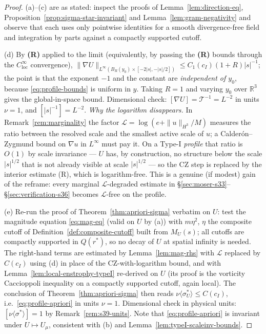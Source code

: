 \documentclass[11pt]{article}
\theoremstyle{definition}
\theoremstyle{remark}
\newcommand{\R}{\mathbb{R}}
\begin{document}
\begin{proof}
  (a)--(c) are as stated: inspect the proofs of
  Lemma~\ref{lem:direction-eq}, Proposition~\ref{prop:sigma-star-invariant}
  and Lemma~\ref{lem:gram-negativity} and observe that each uses only
  pointwise identities for a smooth divergence-free field and integration by
  parts against a compactly supported cutoff.

  (d) By \textbf{(R)} applied to the limit (equivalently, by passing the
  \textbf{(R)} bounds through the $C^\infty_{\mathrm{loc}}$ convergence),
  $\|\nabla U\|_{L^\infty(B_R(y_0)\times[-2|s|,-|s|/2])}\leq
  C_1(c_I)(1+R)|s|^{-1}$; the point is that the exponent $-1$ and the
  constant are \emph{independent of $y_0$}, because
  \eqref{eq:profile-bounds} is uniform in $y$. Taking $R=1$ and varying
  $y_0$ over $\R^3$ gives the global-in-space bound. Dimensional check:
  $[\nabla U] = \mathcal{T}^{-1} = L^{-2}$ in units $\nu=1$, and
  $[|s|^{-1}]=L^{-2}$. \emph{Why the logarithm disappears.} In
  Remark~\ref{rem:marginality} the factor
  $\mathcal{L}=\log(e+\|u\|_{H^3}/M)$ measures the ratio between the resolved
  scale and the smallest active scale of $u$; a Calder\'on--Zygmund bound on
  $\nabla u$ in $L^\infty$ must pay it. On a Type-I \emph{profile} that ratio
  is $O(1)$ by scale invariance --- $U$ has, by construction, no structure
  below the scale $|s|^{1/2}$ that is not already visible at scale
  $|s|^{1/2}$ --- so the CZ step is replaced by the interior estimate (R),
  which is logarithm-free. This is a genuine (if modest) gain of the reframe:
  every marginal $\mathcal{L}$-degraded estimate in
  \S\ref{sec:moser-s33}--\S\ref{sec:verification-s36} becomes
  $\mathcal{L}$-free on the profile.

  (e) Re-run the proof of Theorem~\ref{thm:apriori-sigma} verbatim on $U$:
  test the magnitude equation \eqref{eq:mag-eq} (valid on $U$ by (a)) with
  $m\eta^2$, $\eta$ the composite cutoff of
  Definition~\ref{def:composite-cutoff} built from $M_U(s)$; all cutoffs are
  compactly supported in $Q(r^*)$, so no decay of $U$ at spatial infinity is
  needed. The right-hand terms are estimated by
  Lemma~\ref{lem:mag-rhs} with $\mathcal{L}$ replaced by $C(c_I)$ using (d)
  in place of the CZ-with-logarithm bound, and with
  Lemma~\ref{lem:local-enstrophy-typeI} re-derived on $U$ (its proof is the
  vorticity Caccioppoli inequality on a compactly supported cutoff, again
  local). The conclusion of Theorem~\ref{thm:apriori-sigma} then reads
  $\nu\langle\sigma^*_U\rangle\leq C(c_I)$, i.e.\ \eqref{eq:profile-apriori}
  in units $\nu=1$. Dimensional check in physical units:
  $[\nu\langle\sigma^*\rangle]=1$ by Remark~\ref{rem:s39-units}. Note that
  \eqref{eq:profile-apriori} is invariant under $U\mapsto U_\mu$, consistent
  with (b) and Lemma~\ref{lem:typeI-scaleinv-bounds}.
\end{proof}
\end{document}
